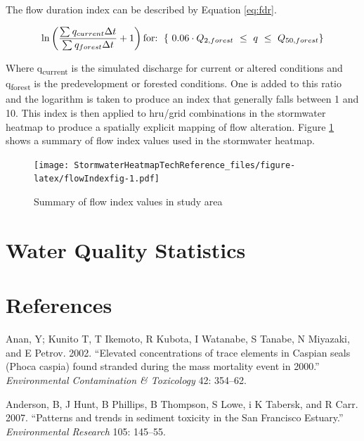 \documentclass[
]{report}
\begin{document}
The flow duration index can be described by Equation \eqref{eq:fdr}.

\begin{equation}
  \ln\left(\frac{\sum_{ }^{ }q_{current}\Delta t}{\sum_{ }^{ }q_{forest}\Delta t}+1\right) \\
  \text{for: }\left\{ \ 0.06\cdot Q_{2,forest\ }\le\ q\ \le\ Q_{50,forest}\right\}   
  \label{eq:fdr}
\end{equation}

Where q\textsubscript{current} is the simulated discharge for current or altered conditions and q\textsubscript{forest} is the predevelopment or forested conditions. One is added to this ratio and the logarithm is taken to produce an index that generally falls between 1 and 10. This index is then applied to hru/grid combinations in the stormwater heatmap to produce a spatially explicit mapping of flow alteration. Figure \ref{fig:flowIndexfig} shows a summary of flow index values used in the stormwater heatmap.

\begin{figure}
\centering
\texttt{[image: StormwaterHeatmapTechReference\_files/figure-latex/flowIndexfig-1.pdf]}
\caption{\label{fig:flowIndexfig}Summary of flow index values in study area}
\end{figure}

\hypertarget{water-quality-statistics}{%
\chapter{Water Quality Statistics}\label{water-quality-statistics}}

\hypertarget{references}{%
\chapter{References}\label{references}}

\hypertarget{refs}{}
\leavevmode\hypertarget{ref-Anan2002}{}%
Anan, Y; Kunito T, T Ikemoto, R Kubota, I Watanabe, S Tanabe, N Miyazaki, and E Petrov. 2002. ``Elevated concentrations of trace elements in Caspian seals (Phoca caspia) found stranded during the mass mortality event in 2000.'' \emph{Environmental Contamination \& Toxicology} 42: 354--62.

\leavevmode\hypertarget{ref-Anderson2007}{}%
Anderson, B, J Hunt, B Phillips, B Thompson, S Lowe, i K Tabersk, and R Carr. 2007. ``Patterns and trends in sediment toxicity in the San Francisco Estuary.'' \emph{Environmental Research} 105: 145--55.
\end{document}
